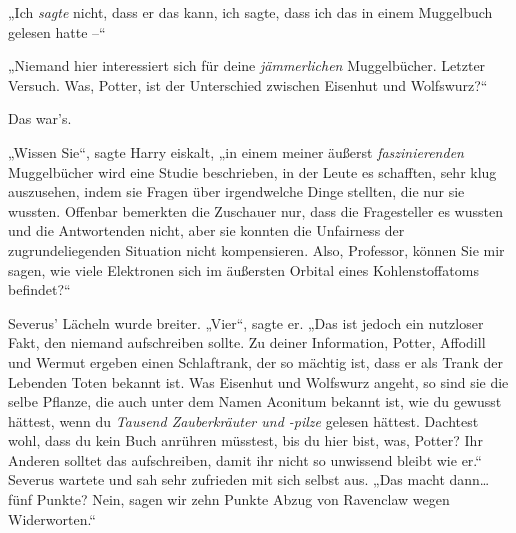„Ich \emph{sagte} nicht, dass er das kann, ich sagte, dass ich das in einem Muggelbuch gelesen hatte –“

„Niemand hier interessiert sich für deine \emph{jämmerlichen} Muggelbücher. Letzter Versuch. Was, Potter, ist der Unterschied zwischen Eisenhut und Wolfswurz?“

Das war’s.

„Wissen Sie“, sagte Harry eiskalt, „in einem meiner äußerst \emph{faszinierenden} Muggelbücher wird eine Studie beschrieben, in der Leute es schafften, sehr klug auszusehen, indem sie Fragen über irgendwelche Dinge stellten, die nur sie wussten. Offenbar bemerkten die Zuschauer nur, dass die Fragesteller es wussten und die Antwortenden nicht, aber sie konnten die Unfairness der zugrundeliegenden Situation nicht kompensieren. Also, Professor, können Sie mir sagen, wie viele Elektronen sich im äußersten Orbital eines Kohlenstoffatoms befindet?“

Severus’ Lächeln wurde breiter. „Vier“, sagte er. „Das ist jedoch ein nutzloser Fakt, den niemand aufschreiben sollte. Zu deiner Information, Potter, Affodill und Wermut ergeben einen Schlaftrank, der so mächtig ist, dass er als Trank der Lebenden Toten bekannt ist. Was Eisenhut und Wolfswurz angeht, so sind sie die selbe Pflanze, die auch unter dem Namen Aconitum bekannt ist, wie du gewusst hättest, wenn du \emph{Tausend Zauberkräuter und -pilze} gelesen hättest. Dachtest wohl, dass du kein Buch anrühren müsstest, bis du hier bist, was, Potter? Ihr Anderen solltet das aufschreiben, damit ihr nicht so unwissend bleibt wie er.“ Severus wartete und sah sehr zufrieden mit sich selbst aus. „Das macht dann…fünf Punkte? Nein, sagen wir zehn Punkte Abzug von Ravenclaw wegen Widerworten.“


